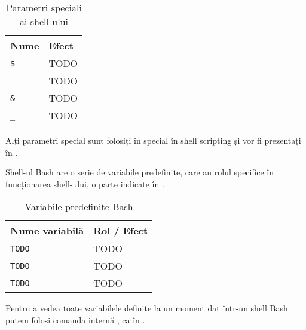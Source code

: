 \begin{table}[!htb]
  \caption{Parametri speciali ai shell-ului}
  \begin{center}
    \begin{tabular}{ p{} p{} }
      \toprule
        \textbf{Nume} &
        \textbf{Efect} \\
      \midrule
        \texttt{\$} &
        TODO \\

        \texttt{\!} &
        TODO \\

        \texttt{\&} &
        TODO \\

        \texttt{\_} &
        TODO \\
      \bottomrule
    \end{tabular}
    \label{tab:cli:special-shell-vars}
  \end{center}
\end{table}

Alți parametri special sunt folosiți în special în shell scripting și vor fi
prezentați în .

Shell-ul Bash are o serie de variabile predefinite, care au rolul specifice în
funcționarea shell-ului, o parte indicate în .

\begin{table}[!htb]
  \caption{Variabile predefinite Bash}
  \begin{center}
    \begin{tabular}{ p{} p{} }
      \toprule
        \textbf{Nume variabilă} &
        \textbf{Rol / Efect} \\
      \midrule
        \texttt{TODO} &
        TODO \\

        \texttt{TODO} &
        TODO \\

        \texttt{TODO} &
        TODO \\
      \bottomrule
    \end{tabular}
    \label{tab:cli:shell-vars}
  \end{center}
\end{table}

Pentru a vedea toate variabilele definite la un moment dat într-un shell Bash
putem folosi comanda internă , ca în .

